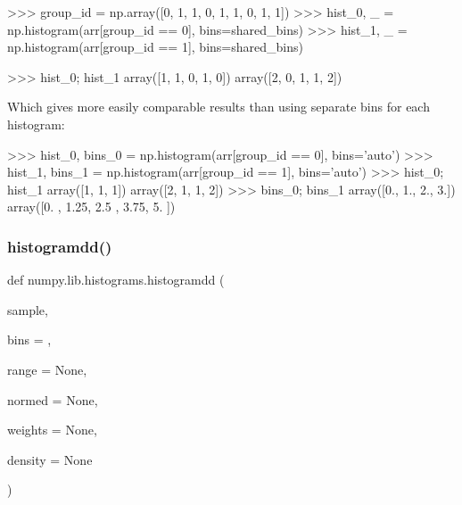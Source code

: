 \begin{DoxyVerb}
>>> group_id = np.array([0, 1, 1, 0, 1, 1, 0, 1, 1])
>>> hist_0, _ = np.histogram(arr[group_id == 0], bins=shared_bins)
>>> hist_1, _ = np.histogram(arr[group_id == 1], bins=shared_bins)

>>> hist_0; hist_1
array([1, 1, 0, 1, 0])
array([2, 0, 1, 1, 2])

Which gives more easily comparable results than using separate bins for
each histogram:

>>> hist_0, bins_0 = np.histogram(arr[group_id == 0], bins='auto')
>>> hist_1, bins_1 = np.histogram(arr[group_id == 1], bins='auto')
>>> hist_0; hist_1
array([1, 1, 1])
array([2, 1, 1, 2])
>>> bins_0; bins_1
array([0., 1., 2., 3.])
array([0.  , 1.25, 2.5 , 3.75, 5.  ])\end{DoxyVerb}
 \mbox{\label{namespacenumpy_1_1lib_1_1histograms_a387ca3b1d269072c6d588753fe308c2c}} 
\subsubsection{\texorpdfstring{histogramdd()}{histogramdd()}}
{\footnotesize\ttfamily def numpy.\+lib.\+histograms.\+histogramdd (\begin{DoxyParamCaption}\item[{}]{sample,  }\item[{}]{bins = {},  }\item[{}]{range = {\ttfamily None},  }\item[{}]{normed = {\ttfamily None},  }\item[{}]{weights = {\ttfamily None},  }\item[{}]{density = {\ttfamily None} }\end{DoxyParamCaption})}

